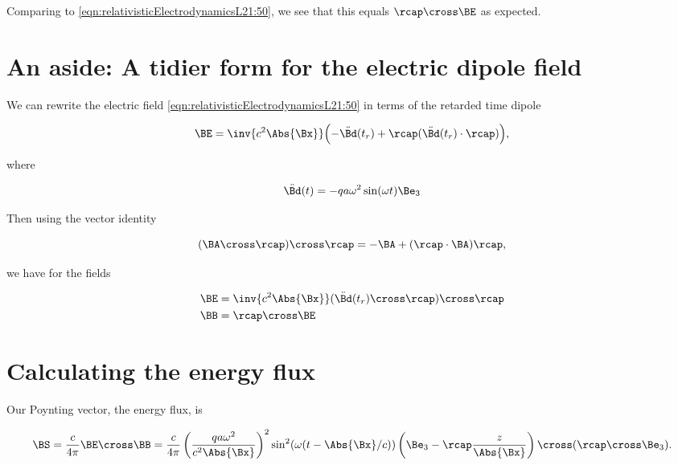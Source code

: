 Comparing to \ref{eqn:relativisticElectrodynamicsL21:50}, we see that this equals $\rcap \cross \BE$ as expected.

\section{An aside: A tidier form for the electric dipole field}

We can rewrite the electric field \ref{eqn:relativisticElectrodynamicsL21:50} in terms of the retarded time dipole

\begin{equation}\label{eqn:relativisticElectrodynamicsL21:n}
\BE = \inv{c^2 \Abs{\Bx}} \Bigl( -\ddot{\Bd}(t_r) + \rcap ( \ddot{\Bd}(t_r) \cdot \rcap ) \Bigr),
\end{equation}

where 

\begin{equation}\label{eqn:relativisticElectrodynamicsL21:n}
\ddot{\Bd}(t) = - q a \omega^2 \sin(\omega t) \Be_3
\end{equation}

Then using the vector identity

\begin{equation}\label{eqn:relativisticElectrodynamicsL21:n}
(\BA \cross \rcap ) \cross \rcap = -\BA + (\rcap \cdot \BA) \rcap,
\end{equation}

we have for the fields

\begin{align}\label{eqn:relativisticElectrodynamicsL21:n}
\BE &= \inv{c^2 \Abs{\Bx}} (\ddot{\Bd}(t_r) \cross \rcap) \cross \rcap \\
\BB &= \rcap \cross \BE
\end{align}

\section{Calculating the energy flux}

Our Poynting vector, the energy flux, is

\begin{equation}\label{eqn:relativisticElectrodynamicsL21:n}
\BS = \frac{c}{4 \pi} \BE \cross \BB = 
\frac{c}{4 \pi}
\left( \frac{q a \omega^2}{c^2 \Abs{\Bx} } \right)^2
\sin^2(\omega (t - \Abs{\Bx}/c))
\left( \Be_3 - \rcap \frac{z}{\Abs{\Bx}} \right) \cross (\rcap \cross \Be_3).
\end{equation}

